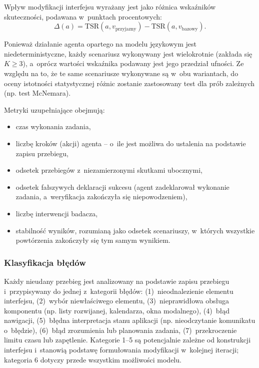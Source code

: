 Wpływ modyfikacji interfejsu wyrażany jest jako różnica wskaźników skuteczności, podawana w~punktach procentowych:
\begin{equation}
    \Delta(a) = \mathrm{TSR}(a, v_{\mathrm{przyjazny}}) - \mathrm{TSR}(a, v_{\mathrm{bazowy}}).
    \label{eq:delta}
\end{equation}

Ponieważ działanie agenta opartego na modelu językowym jest niedeterministyczne, każdy scenariusz wykonywany jest wielokrotnie (zakłada się $K \geq 3$), a~oprócz wartości wskaźnika podawany jest jego przedział ufności. Ze względu na to, że te same scenariusze wykonywane są w~obu wariantach, do oceny istotności statystycznej różnic zostanie zastosowany test dla prób zależnych (np. test McNemara).

Metryki uzupełniające obejmują:
\begin{itemize}
    \item czas wykonania zadania,
    \item liczbę kroków (akcji) agenta -- o~ile jest możliwa do ustalenia na podstawie zapisu przebiegu,
    \item odsetek przebiegów z~niezamierzonymi skutkami ubocznymi,
    \item odsetek fałszywych deklaracji sukcesu (agent zadeklarował wykonanie zadania, a~weryfikacja zakończyła się niepowodzeniem),
    \item liczbę interwencji badacza,
    \item stabilność wyników, rozumianą jako odsetek scenariuszy, w~których wszystkie powtórzenia zakończyły się tym samym wynikiem.
\end{itemize}

\subsubsection{Klasyfikacja błędów}
Każdy nieudany przebieg jest analizowany na podstawie zapisu przebiegu i~przypisywany do jednej z~kategorii błędów: (1)~nieodnalezienie elementu interfejsu, (2)~wybór niewłaściwego elementu, (3)~nieprawidłowa obsługa komponentu (np. listy rozwijanej, kalendarza, okna modalnego), (4)~błąd nawigacji, (5)~błędna interpretacja stanu aplikacji (np. nieodczytanie komunikatu o~błędzie), (6)~błąd zrozumienia lub planowania zadania, (7)~przekroczenie limitu czasu lub zapętlenie. Kategorie 1--5 są potencjalnie zależne od konstrukcji interfejsu i~stanowią podstawę formułowania modyfikacji w~kolejnej iteracji; kategoria 6 dotyczy przede wszystkim możliwości modelu.

